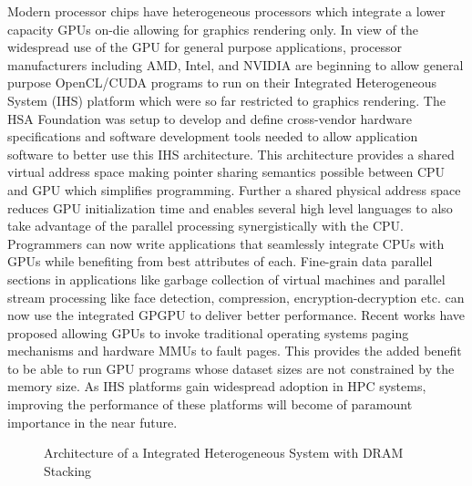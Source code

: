 \par Modern processor chips have heterogeneous processors which integrate a lower capacity GPUs on-die allowing for graphics rendering only. In view of the widespread use of the GPU for general purpose applications, processor manufacturers including AMD\cite{amd-apu}, Intel\cite{inteliris}, and NVIDIA\cite{denver} are beginning to allow general purpose OpenCL/CUDA programs to run on their Integrated Heterogeneous System (IHS) platform which were so far restricted to graphics rendering. The HSA Foundation \cite{hsafoundation} was setup to develop and define cross-vendor hardware specifications and software development tools needed to allow application software to better use this IHS architecture. This architecture provides a shared virtual address space making pointer sharing semantics possible between CPU and GPU which simplifies programming. Further a shared physical address space reduces GPU initialization time and enables several high level languages to also take advantage of the parallel processing synergistically with the CPU. Programmers can now write applications that seamlessly integrate CPUs with GPUs while benefiting from best attributes of each. Fine-grain data parallel sections in applications like garbage collection of virtual machines \cite{sumatra} and parallel stream processing like face detection, compression, encryption-decryption etc. can now use the integrated GPGPU to deliver better performance. Recent works have proposed allowing GPUs to invoke traditional operating systems paging mechanisms and hardware MMUs to fault pages. This provides the added benefit to be able to run GPU programs whose dataset sizes are not constrained by the memory size. As IHS platforms gain widespread adoption in HPC systems, improving the performance of these platforms will become of paramount importance in the near future. \cite{apu-exascale,amd-exascale1}


\begin{figure}[!htb]
    \centering
    \hsacpu
    \caption{Architecture of a Integrated Heterogeneous System with DRAM Stacking}
    \label{hsa-arch}
\end{figure}

